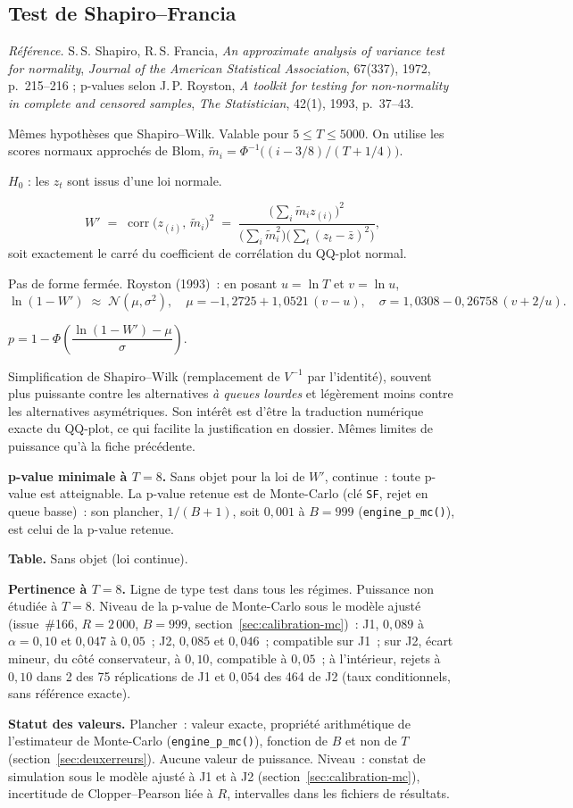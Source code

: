 \documentclass[a4paper,11pt]{article}
\newcommand{\code}[1]{\texttt{\small #1}}
\newcommand{\refl}[1]{{\small\textcolor{maincolor!70!black}{\textit{Référence.} #1}}\par\smallskip}
\newcounter{ficheid}
\newenvironment{fiche}[1]{%
  \stepcounter{ficheid}%
  \phantomsection
  \subsection{#1}%
  \label{fiche:\theficheid}%
}{%
  \end{description}\vspace{0.5em}%
}
\newcommand{\Cadre}{%
  \begin{description}[leftmargin=0pt, style=unboxed, itemsep=3pt, topsep=3pt, parsep=2pt]%
  \item[\textcolor{financeblue}{\textbf{1. Cadre, notations et hypothèses de validité (non testées).}}]}
\newcommand{\Hzero}{\item[\textcolor{financeblue}{\textbf{2. Hypothèse nulle.}}]}
\newcommand{\Stat}{\item[\textcolor{financeblue}{\textbf{3. Statistique de test.}}]}
\newcommand{\Loi}{\item[\textcolor{financeblue}{\textbf{4. Loi sous $H_0$.}}]}
\newcommand{\Pval}{\item[\textcolor{financeblue}{\textbf{5. p-value.}}]}
\newcommand{\Usage}{\item[\textcolor{financeblue}{\textbf{6. Usage et limites.}}]}
\newcommand{\Pertinence}{\item[\textcolor{financeblue}{\textbf{7. Pertinence et puissance à faible $T$.}}]}
\begin{document}
\begin{fiche}{Test de Shapiro--Francia}
\label{fiche:shapiro-francia}%
\refl{S.\,S. Shapiro, R.\,S. Francia, \emph{An approximate analysis of variance test for
normality}, \emph{Journal of the American Statistical Association}, 67(337), 1972, p.~215--216 ;
p-values selon J.\,P. Royston, \emph{A toolkit for testing for non-normality in complete and
censored samples}, \emph{The Statistician}, 42(1), 1993, p.~37--43.}
\Cadre
Mêmes hypothèses que Shapiro--Wilk. Valable pour $5 \le T \le 5000$. On utilise les scores normaux
approchés de Blom, $\tilde m_i = \Phi^{-1}\!\big((i - 3/8)/(T + 1/4)\big)$.
\Hzero
$H_0$ : les $z_t$ sont issus d'une loi normale.
\Stat
\[
  W' \;=\; \operatorname{corr}\big(z_{(i)},\, \tilde m_i\big)^2
  \;=\; \frac{\Big(\sum_i \tilde m_i z_{(i)}\Big)^2}
              {\Big(\sum_i \tilde m_i^2\Big)\Big(\sum_t (z_t-\bar z)^2\Big)} ,
\]
soit exactement le carré du coefficient de corrélation du QQ-plot normal.
\Loi
Pas de forme fermée. Royston (1993)~: en posant $u = \ln T$ et $v = \ln u$,
\[
  \ln(1-W') \;\approx\; \mathcal{N}(\mu, \sigma^2),\quad
  \mu = -1{,}2725 + 1{,}0521\,(v-u),\quad
  \sigma = 1{,}0308 - 0{,}26758\,(v + 2/u).
\]
\Pval
$p = 1 - \Phi\!\left(\dfrac{\ln(1-W') - \mu}{\sigma}\right)$.
\Usage
Simplification de Shapiro--Wilk (remplacement de $V^{-1}$ par l'identité), souvent plus puissante
contre les alternatives \emph{à queues lourdes} et légèrement moins contre les alternatives
asymétriques. Son intérêt est d'être la traduction numérique exacte du QQ-plot, ce qui facilite la
justification en dossier. Mêmes limites de puissance qu'à la fiche précédente.
\Pertinence
\textbf{p-value minimale à $T = 8$.} Sans objet pour la loi de $W'$, continue~: toute p-value est atteignable. La p-value retenue est de Monte-Carlo (clé \code{SF}, rejet en queue basse)~: son plancher, $1/(B+1)$, soit $0{,}001$ à $B = 999$ (\code{engine\_p\_mc()}), est celui de la p-value retenue.

\textbf{Table.} Sans objet (loi continue).

\textbf{Pertinence à $T = 8$.} Ligne de type test dans tous les régimes. Puissance non étudiée à $T = 8$. Niveau de la p-value de Monte-Carlo sous le modèle ajusté (issue~\#166, $R = 2\,000$, $B = 999$, section~\ref{sec:calibration-mc})~: J1, $0{,}089$ à $\alpha = 0{,}10$ et $0{,}047$ à $0{,}05$~; J2, $0{,}085$ et $0{,}046$~; compatible sur J1~; sur J2, écart mineur, du côté conservateur, à $0{,}10$, compatible à $0{,}05$~; à l'intérieur, rejets à $0{,}10$ dans 2 des 75 réplications de J1 et $0{,}054$ des 464 de J2 (taux conditionnels, sans référence exacte).

\textbf{Statut des valeurs.} Plancher~: valeur exacte, propriété arithmétique de l'estimateur de Monte-Carlo (\code{engine\_p\_mc()}), fonction de $B$ et non de $T$ (section~\ref{sec:deuxerreurs}). Aucune valeur de puissance. Niveau~: constat de simulation sous le modèle ajusté à J1 et à J2 (section~\ref{sec:calibration-mc}), incertitude de Clopper--Pearson liée à $R$, intervalles dans les fichiers de résultats.
\end{fiche}
\end{document}
